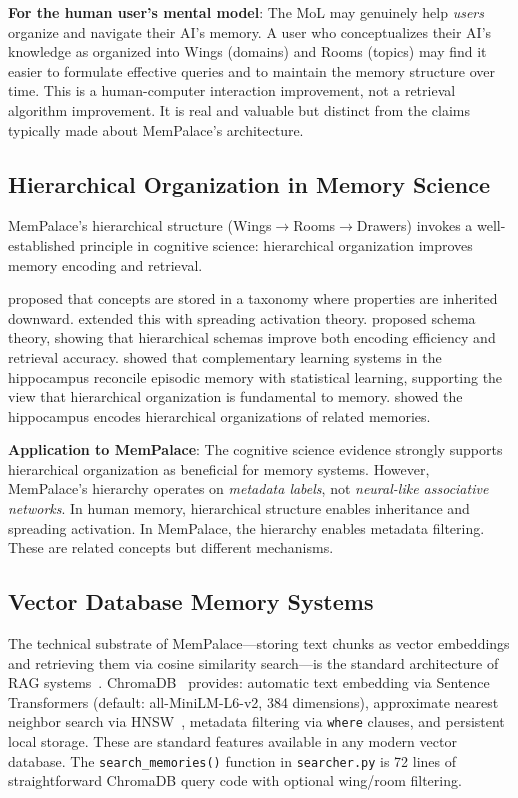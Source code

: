 \documentclass[twoside,11pt]{article}
\begin{document}
\textbf{For the human user's mental model}: The MoL may genuinely help
\emph{users} organize and navigate their AI's memory.  A user who
conceptualizes their AI's knowledge as organized into Wings (domains) and
Rooms (topics) may find it easier to formulate effective queries and to
maintain the memory structure over time.  This is a human-computer interaction
improvement, not a retrieval algorithm improvement.  It is real and valuable
but distinct from the claims typically made about MemPalace's architecture.

\subsection{Hierarchical Organization in Memory Science}

MemPalace's hierarchical structure (Wings$\to$Rooms$\to$Drawers) invokes a
well-established principle in cognitive science: hierarchical organization
improves memory encoding and retrieval.

\citet{collins1969} proposed that concepts are stored in a taxonomy where
properties are inherited downward.  \citet{collins1975} extended this with
spreading activation theory.  \citet{bartlett1932} proposed schema theory,
showing that hierarchical schemas improve both encoding efficiency and
retrieval accuracy.  \citet{schapiro2017} showed that complementary learning systems in the
hippocampus reconcile episodic memory with statistical learning, supporting
the view that hierarchical organization is fundamental to memory.  \citet{collin2020} showed the hippocampus encodes
hierarchical organizations of related memories.

\textbf{Application to MemPalace}: The cognitive science evidence strongly
supports hierarchical organization as beneficial for memory systems.  However,
MemPalace's hierarchy operates on \emph{metadata labels}, not
\emph{neural-like associative networks}.  In human memory, hierarchical
structure enables inheritance and spreading activation.  In MemPalace, the
hierarchy enables metadata filtering.  These are related concepts but
different mechanisms.

\subsection{Vector Database Memory Systems}

The technical substrate of MemPalace---storing text chunks as vector embeddings
and retrieving them via cosine similarity search---is the standard architecture
of RAG systems~\citep{rag}.  ChromaDB~\citep{chromadb} provides: automatic
text embedding via Sentence Transformers (default: all-MiniLM-L6-v2,
384 dimensions), approximate nearest neighbor search via
HNSW~\citep{malkov2020}, metadata filtering via \texttt{where} clauses, and
persistent local storage.  These are standard features available in any modern
vector database.  The \texttt{search\_memories()} function in
\texttt{searcher.py} is 72 lines of straightforward ChromaDB query code with
optional wing/room filtering.
\end{document}
